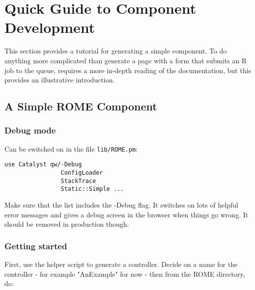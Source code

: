 \chapter{Quick Guide to Component Development}
\label{sec:comp_dev}

% 

This section provides a tutorial for generating a simple component. To do anything more complicated than generate a page with a form that submits an R job to the queue, requires a more in-depth reading of the documentation, but this provides an illustrative introduction.

\section{A Simple ROME Component}

\subsection{Debug mode}
Can be switched on in the file \verb|lib/ROME.pm|:

\begin{verbatim}
use Catalyst qw/-Debug 
                ConfigLoader 
                StackTrace
                Static::Simple ...
\end{verbatim}

Make sure that the list includes the -Debug flag. It switches on lots of helpful error messages and gives a debug screen in the browser when things go wrong. It should be removed in production though.

\subsection{Getting started}
First, use the helper script to generate a controller. Decide on a name for the controller - for example "AnExample" for now - then from the ROME directory, do:

